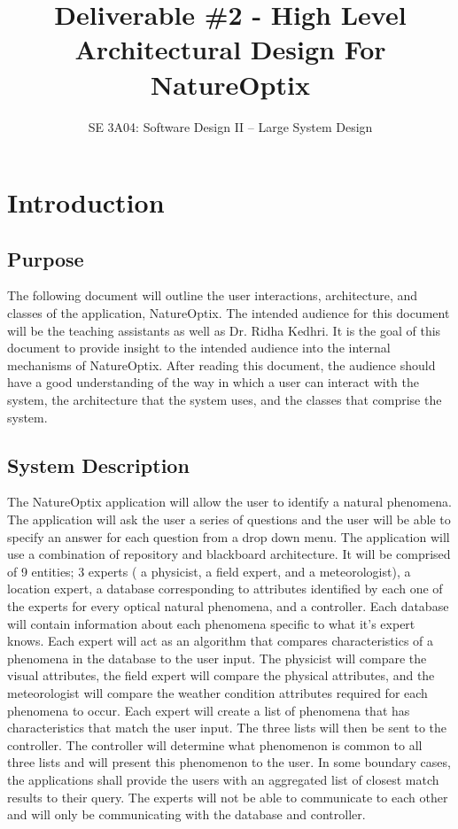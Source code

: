 \documentclass[]{article}
\title{Deliverable \#2 - High Level Architectural Design For NatureOptix}
\author{SE 3A04: Software Design II -- Large System Design}
\date{}
\begin{document}
\maketitle	

\section{Introduction}
\label{sec:introduction}



\subsection{Purpose}
\label{sub:purpose}
The following document will outline the user interactions, architecture, and classes of the application, NatureOptix.  The intended audience for this document will be the teaching assistants as well as Dr. Ridha Kedhri. It is the goal of this document to provide insight to the intended audience into the internal mechanisms of NatureOptix. After reading this document, the audience should have a good understanding of the way in which a user can interact with the system, the architecture that the system uses, and the classes that comprise the system. 

\subsection{System Description}
\label{sub:system_description}
The NatureOptix application will allow the user to identify a natural phenomena. The application will ask the user a series of questions and the user will be able to specify an answer for each question from a drop down menu. The application will use a combination of repository and blackboard architecture. It will be comprised of 9 entities; 3 experts ( a physicist, a field expert, and a meteorologist), a location expert, a database corresponding to attributes identified by each one of the experts for every optical natural phenomena, and a controller. Each database will contain information about each phenomena specific to what it's expert knows. Each expert will act as an algorithm that compares characteristics of a phenomena in the database to the user input. The physicist will compare the visual attributes, the field expert will compare the physical attributes, and the meteorologist will compare the weather condition attributes required for each phenomena to occur. Each expert will create a list of phenomena that has characteristics that match the user input. The three lists will then be sent to the controller. The controller will determine what phenomenon is common to all three lists and will present this phenomenon to the user. In some boundary cases, the applications shall provide the users with an aggregated list of closest match results to their query. The experts will not be able to communicate to each other and will only be communicating with the database and controller. 
\end{document}
